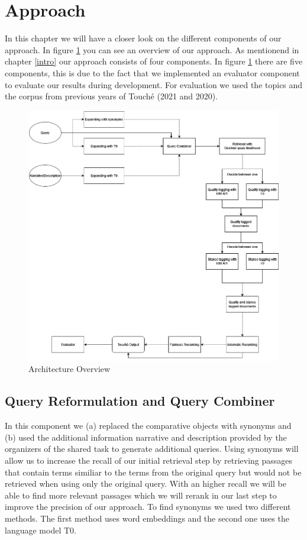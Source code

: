 \section{Approach} \label{approach}
    In this chapter we will have a closer look on the different components of our approach. In figure \ref{fig:pipeline} you can see an overview of our approach. As mentionend in chapter \ref{intro} our approach consists of four components. In figure \ref{fig:pipeline} there are five components, this is due to the fact that we implemented an evaluator component to evaluate our results during development. For evaluation we used the topics and the corpus from previous years of Touché (2021 and 2020).

    \begin{figure}[h]
        \centering
        \includegraphics[scale=0.4]{figures/pipeline}
        \caption{Architecture Overview}
        \label{fig:pipeline}
    \end{figure}

    \subsection{Query Reformulation and Query Combiner}
        In this component we (a) replaced the comparative objects with synonyms and (b) used the additional information narrative and description  provided by the organizers of the shared task to generate additional queries. Using synonyms will allow us to increase the recall of our initial retrieval step by retrieving passages that contain terms similiar to the terms from the original query but would not be retrieved when using only the original query. With an higher recall we will be able to find more relevant passages which we will rerank in our last step to improve the precision of our approach. To find synonyms we used two different methods. The first method uses word embeddings and the second one uses the language model T0.    
